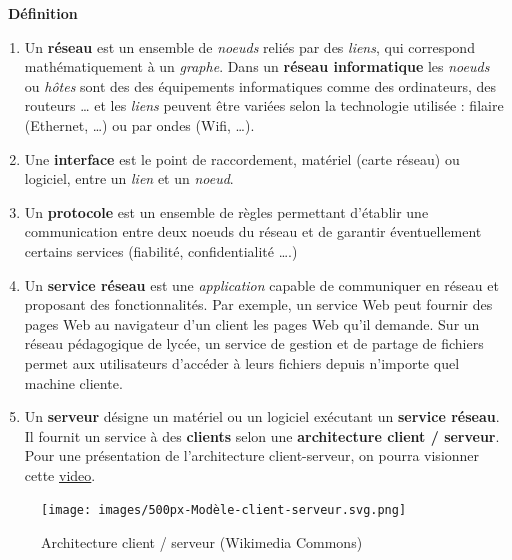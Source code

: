 \documentclass[
  11pt,
]{article}
\providecommand{\tightlist}{%
  \setlength{\itemsep}{0pt}\setlength{\parskip}{0pt}}
\newcounter{prop}
\newcounter{def}
\newenvironment{definition}[1]
{\par \medskip   \addtocounter{def}{1} \noindent  
\begin{bclogo}[arrondi =0.1,  ombre = true, barre=none, logo=\bcbook, marge=4]{~\textbf{Définition} \textbf{\thedef} {\itshape #1} }  \par}
{
\end{bclogo}
 \par \bigskip }
\newcounter{logi}
\begin{document}
\begin{definition}{}

\begin{enumerate}
\def\labelenumi{\arabic{enumi}.}
\tightlist
\item
  Un \textbf{réseau} est un ensemble de \emph{noeuds} reliés par des
  \emph{liens}, qui correspond mathématiquement à un \emph{graphe}. Dans
  un \textbf{réseau informatique} les \emph{noeuds} ou \emph{hôtes} sont
  des des équipements informatiques comme des ordinateurs, des routeurs
  \ldots{} et les \emph{liens} peuvent être variées selon la technologie
  utilisée : filaire (Ethernet, \ldots) ou par ondes (Wifi, \ldots).
\item
  Une \textbf{interface} est le point de raccordement, matériel (carte
  réseau) ou logiciel, entre un \emph{lien} et un \emph{noeud}.
\item
  Un \textbf{protocole} est un ensemble de règles permettant d'établir
  une communication entre deux noeuds du réseau et de garantir
  éventuellement certains services (fiabilité, confidentialité \ldots.)
\item
  Un \textbf{service réseau} est une \emph{application} capable de
  communiquer en réseau et proposant des fonctionnalités. Par exemple,
  un service Web peut fournir des pages Web au navigateur d'un client
  les pages Web qu'il demande. Sur un réseau pédagogique de lycée, un
  service de gestion et de partage de fichiers permet aux utilisateurs
  d'accéder à leurs fichiers depuis n'importe quel machine cliente.
\item
  Un \textbf{serveur} désigne un matériel ou un logiciel exécutant un
  \textbf{service réseau}. Il fournit un service à des \textbf{clients}
  selon une \textbf{architecture client / serveur}. Pour une
  présentation de l'architecture client-serveur, on pourra visionner
  cette \href{https://vimeo.com/138623558}{video}.
\end{enumerate}

\end{definition}

\begin{figure}
\centering
\texttt{[image: images/500px-Modèle-client-serveur.svg.png]}
\caption{Architecture client / serveur (Wikimedia Commons)}
\end{figure}
\end{document}
